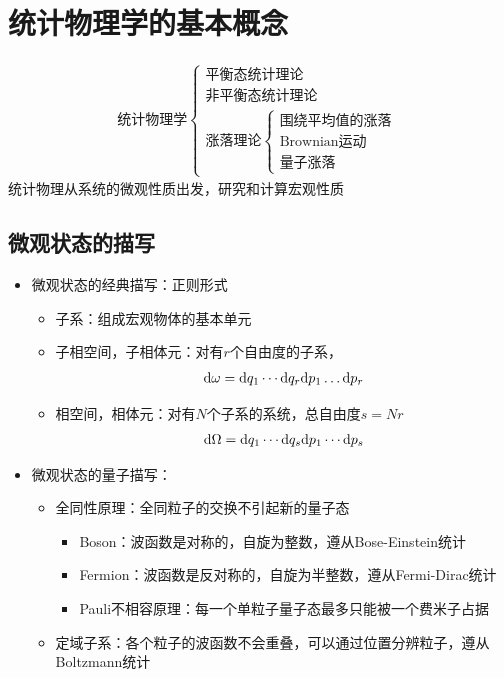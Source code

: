 \chapter{统计物理学的基本概念}

\begin{gather*}
    \text{统计物理学}
    \begin{cases}
        \text{平衡态统计理论}
        \\
        \text{非平衡态统计理论}
        \\
        \text{涨落理论}
        \begin{cases}
            \text{围绕平均值的涨落}
            \\
            \text{Brownian运动}
            \\
            \text{量子涨落}
        \end{cases}
    \end{cases}
\end{gather*}
统计物理从系统的微观性质出发，研究和计算宏观性质

\section{微观状态的描写}

\begin{itemize}
    \item 微观状态的经典描写：正则形式
    \begin{itemize}
        \item 子系：组成宏观物体的基本单元
        \item 子相空间，子相体元：对有$r$个自由度的子系，
        \begin{gather*}
            \mathrm{d} \omega = \mathrm{d} q_1 \cdots \mathrm{d} q_r \mathrm{d} p_1 \dots \mathrm{d} p_r
        \end{gather*}
        \item 相空间，相体元：对有$N$个子系的系统，总自由度$s=Nr$
        \begin{gather*}
            \mathrm{d} \Omega = \mathrm{d} q_1 \cdots \mathrm{d} q_s \mathrm{d} p_1 \cdots \mathrm{d} p_s
        \end{gather*}
    \end{itemize}
    \item 微观状态的量子描写：
    \begin{itemize}
        \item 全同性原理：全同粒子的交换不引起新的量子态
        \begin{itemize}
            \item Boson：波函数是对称的，自旋为整数，遵从Bose-Einstein统计
            \item Fermion：波函数是反对称的，自旋为半整数，遵从Fermi-Dirac统计
            \item Pauli不相容原理：每一个单粒子量子态最多只能被一个费米子占据
        \end{itemize}
        \item 定域子系：各个粒子的波函数不会重叠，可以通过位置分辨粒子，遵从Boltzmann统计
    \end{itemize}
\end{itemize}

